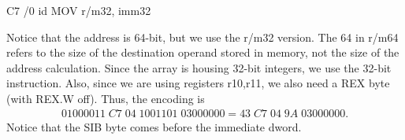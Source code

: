 \documentclass{report}
\begin{document}
\begin{itemize}
\begin{cppcode}
                C7 /0 id MOV r/m32, imm32
                \end{cppcode}
                \bigbreak \noindent 
                Notice that the address is 64-bit, but we use the r/m32 version. The 64 in r/m64 refers to the size of the destination operand stored in memory, not the size of the address calculation. Since the array is housing 32-bit integers, we use the 32-bit instruction. Also, since we are using registers r10,r11, we also need a REX byte (with REX.W off). Thus, the encoding is 
                \begin{align*}
                    01000011\; C7\; 04\; 1001101\; 03000000 = 43\; C7\; 04\; 9A\; 03000000 
                .\end{align*}
                Notice that the SIB byte comes before the immediate dword.

        \end{itemize}
\end{document}
